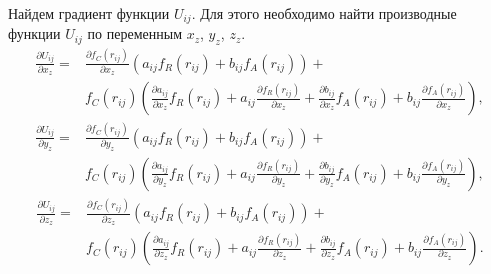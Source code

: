 Найдем градиент функции $U_{ij}$. Для этого необходимо найти производные функции $U_{ij}$ по переменным $x_z$,  $y_z$,  $z_z$.
 \begin{align*}
 \frac{\partial U_{ij}}{\partial x_z} = & \frac{\partial f_C(r_{ij})}{\partial x_z}\left( a_{ij}f_R(r_{ij}) + b_{ij}f_A(r_{ij})\right) + \\
                                                                          & f_C(r_{ij}) \left( \frac{\partial a_{ij}}{\partial x_z}f_R(r_{ij}) + 
                                                                          a_{ij} \frac{\partial f_R(r_{ij})}{\partial x_z} + 
                                                                         \frac{\partial b_{ij}}{\partial x_z}f_A(r_{ij}) + 
                                                                         b_{ij} \frac{\partial f_A(r_{ij})}{\partial x_z} \right),
\end{align*}
 \begin{align*}
 \frac{\partial U_{ij}}{\partial y_z} = & \frac{\partial f_C(r_{ij})}{\partial y_z}\left( a_{ij}f_R(r_{ij}) + b_{ij}f_A(r_{ij})\right) + \\
                                                                          & f_C(r_{ij}) \left( \frac{\partial a_{ij}}{\partial y_z}f_R(r_{ij}) + 
                                                                          a_{ij} \frac{\partial f_R(r_{ij})}{\partial y_z} + 
                                                                         \frac{\partial b_{ij}}{\partial y_z}f_A(r_{ij}) + 
                                                                         b_{ij} \frac{\partial f_A(r_{ij})}{\partial y_z} \right),
\end{align*}
 \begin{align*}
 \frac{\partial U_{ij}}{\partial z_z} = & \frac{\partial f_C(r_{ij})}{\partial z_z}\left( a_{ij}f_R(r_{ij}) + b_{ij}f_A(r_{ij})\right) + \\
                                                                          & f_C(r_{ij}) \left( \frac{\partial a_{ij}}{\partial z_z}f_R(r_{ij}) + 
                                                                          a_{ij} \frac{\partial f_R(r_{ij})}{\partial z_z} + 
                                                                         \frac{\partial b_{ij}}{\partial z_z}f_A(r_{ij}) + 
                                                                         b_{ij} \frac{\partial f_A(r_{ij})}{\partial z_z} \right).
\end{align*} 


